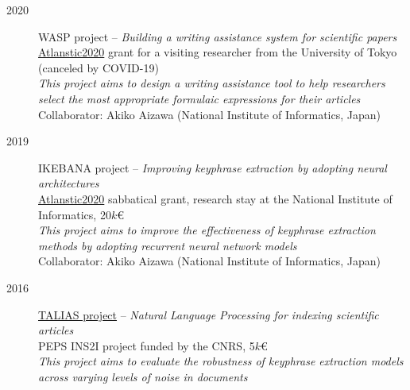 \begin{description}
    \item[2020] WASP project --
                \emph{Building a writing assistance system for scientific papers} \\
                 \href{https://Atlanstic2020.fr/}{Atlanstic2020} grant for a visiting researcher from the University of Tokyo (canceled by COVID-19) \\[.1em]
                 \emph{This project aims to design a writing assistance tool to help researchers select the most appropriate formulaic expressions for their articles} \\[.1em]
                 Collaborator: Akiko Aizawa (National Institute of Informatics, Japan)
                 
    
    \item[2019] IKEBANA project -- 
                \emph{Improving keyphrase extraction by adopting neural architectures} \\
                \href{https://Atlanstic2020.fr/}{Atlanstic2020} sabbatical grant, research stay at the National Institute of Informatics, 20$k$€ \\[.1em]
                \emph{This project aims to improve the effectiveness of keyphrase extraction methods by adopting recurrent neural network models} \\[.1em]
                Collaborator: Akiko Aizawa (National Institute of Informatics, Japan)

    \item[2016] \href{http://boudinfl.github.io/talias/}{TALIAS project} -- 
                \emph{Natural Language Processing for indexing scientific articles} \\
                PEPS INS2I project funded by the CNRS, 5$k$€ \\[.1em]
                \emph{This project aims to evaluate the robustness of keyphrase extraction models across varying levels of noise in documents}


\end{description}
